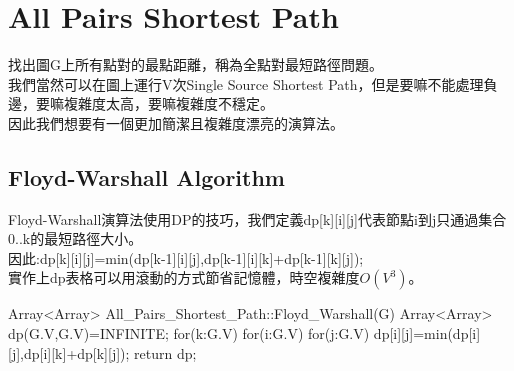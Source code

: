\documentclass{article}
\begin{document}
\section{All Pairs Shortest Path}
找出圖G上所有點對的最點距離，稱為全點對最短路徑問題。\\
我們當然可以在圖上運行V次Single Source Shortest Path，但是要嘛不能處理負邊，要嘛複雜度太高，要嘛複雜度不穩定。\\
因此我們想要有一個更加簡潔且複雜度漂亮的演算法。\\
\subsection{Floyd-Warshall Algorithm}
Floyd-Warshall演算法使用DP的技巧，我們定義dp[k][i][j]代表節點i到j只通過集合{0..k}的最短路徑大小。\\
因此:dp[k][i][j]=min(dp[k-1][i][j],dp[k-1][i][k]+dp[k-1][k][j]);\\
實作上dp表格可以用滾動的方式節省記憶體，時空複雜度$O(V^3)$。\\
\newpage
\begin{algorithm}[caption={Floyd-Warshall Algorithm}, label={alg1}]
Array<Array> All_Pairs_Shortest_Path::Floyd_Warshall(G)
    Array<Array> dp(G.V,G.V)=INFINITE;
    for(k:G.V)
        for(i:G.V)
            for(j:G.V)
                dp[i][j]=min(dp[i][j],dp[i][k]+dp[k][j]);
    return dp;
\end{algorithm}
\end{document}
